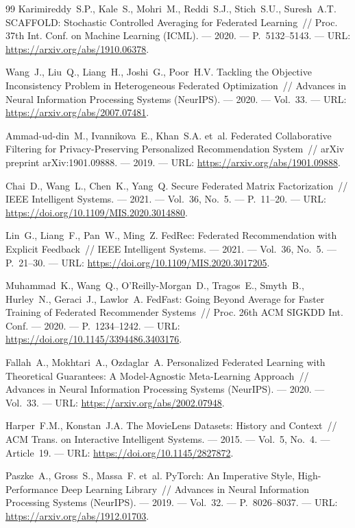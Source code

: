 \documentclass[14pt,a4paper]{extarticle}
\begin{document}
\begin{thebibliography}{99}
Karimireddy~S.P., Kale~S., Mohri~M., Reddi~S.J., Stich~S.U., Suresh~A.T.
SCAFFOLD: Stochastic Controlled Averaging for Federated Learning~//
Proc. 37th Int. Conf. on Machine Learning (ICML). --- 2020. --- P.~5132--5143. --- URL: \url{https://arxiv.org/abs/1910.06378}.

Wang~J., Liu~Q., Liang~H., Joshi~G., Poor~H.V.
Tackling the Objective Inconsistency Problem in Heterogeneous Federated Optimization~//
Advances in Neural Information Processing Systems (NeurIPS). --- 2020. --- Vol.~33. --- URL: \url{https://arxiv.org/abs/2007.07481}.

Ammad-ud-din~M., Ivannikova~E., Khan~S.A. et~al.
Federated Collaborative Filtering for Privacy-Preserving Personalized Recommendation System~//
arXiv preprint arXiv:1901.09888. --- 2019. --- URL: \url{https://arxiv.org/abs/1901.09888}.

Chai~D., Wang~L., Chen~K., Yang~Q.
Secure Federated Matrix Factorization~//
IEEE Intelligent Systems. --- 2021. --- Vol.~36, No.~5. --- P.~11--20. --- URL: \url{https://doi.org/10.1109/MIS.2020.3014880}.

Lin~G., Liang~F., Pan~W., Ming~Z.
FedRec: Federated Recommendation with Explicit Feedback~//
IEEE Intelligent Systems. --- 2021. --- Vol.~36, No.~5. --- P.~21--30. --- URL: \url{https://doi.org/10.1109/MIS.2020.3017205}.

Muhammad~K., Wang~Q., O'Reilly-Morgan~D., Tragos~E., Smyth~B., Hurley~N., Geraci~J., Lawlor~A.
FedFast: Going Beyond Average for Faster Training of Federated Recommender Systems~//
Proc. 26th ACM SIGKDD Int. Conf. --- 2020. --- P.~1234--1242. --- URL: \url{https://doi.org/10.1145/3394486.3403176}.

Fallah~A., Mokhtari~A., Ozdaglar~A.
Personalized Federated Learning with Theoretical Guarantees: A Model-Agnostic Meta-Learning Approach~//
Advances in Neural Information Processing Systems (NeurIPS). --- 2020. --- Vol.~33. --- URL: \url{https://arxiv.org/abs/2002.07948}.

Harper~F.M., Konstan~J.A.
The MovieLens Datasets: History and Context~//
ACM Trans. on Interactive Intelligent Systems. --- 2015. --- Vol.~5, No.~4. --- Article~19. --- URL: \url{https://doi.org/10.1145/2827872}.

Paszke~A., Gross~S., Massa~F. et~al.
PyTorch: An Imperative Style, High-Performance Deep Learning Library~//
Advances in Neural Information Processing Systems (NeurIPS). --- 2019. --- Vol.~32. --- P.~8026--8037. --- URL: \url{https://arxiv.org/abs/1912.01703}.


\end{thebibliography}
\end{document}
